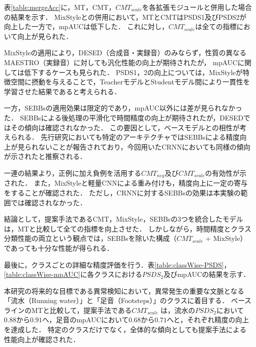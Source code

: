 \documentclass[main]{subfiles}
\begin{document}
表\ref{table:mergeAcc}に，MT，CMT，$CMT_{scale}$を各拡張モジュールと併用した場合の結果を示す． 
MixStyleとの併用において，MTとCMTはPSDS1及びPSDS2が向上した一方で，mpAUCは低下した．
これに対し，$CMT_{scale}$は全ての指標において向上が見られた．\par 

MixStyleの適用により，DESED（合成音・実録音）のみならず，性質の異なるMAESTRO（実録音）に対しても汎化性能の向上が期待されたが，
mpAUCに関しては低下するケースも見られた． 
PSDS1，2の向上については，MixStyleが特徴空間に摂動を与えることで，TeacherモデルとStudentモデル間により一貫性を学習させた結果であると考えられる．\par

一方，SEBBsの適用効果は限定的であり，mpAUC以外には差が見られなかった．
SEBBsによる後処理の平滑化で時間精度の向上が期待されたが，DESEDではその傾向は確認されなかった．
この要因として，ベースモデルとの相性が考えられる．
先行研究においても特定のアーキテクチャではSEBBsによる精度向上が見られないことが報告されており，今回用いたCRNNにおいても同様の傾向が示されたと推察される．\par

一連の結果より，正例に加え負例を活用する$CMT_{neg}$及び$CMT_{scale}$の有効性が示された．
また，MixStyleと軽量CNNによる重み付けも，精度向上に一定の寄与をすることが確認された．
ただし，CRNNに対するSEBBsの効果は本実験の範囲では確認されなかった．\par 

結論として，提案手法であるCMT，MixStyle，SEBBsの3つを統合したモデルは，MTと比較して全ての指標を向上させた．
しかしながら，時間精度とクラス分類性能の両立という観点では，SEBBsを除いた構成（$CMT_{scale}$  + MixStyle）であっても十分な性能が得られる．\par


最後に，クラスごとの詳細な精度評価を行う．表\ref{table:classWise-PSDS}，\ref{table:classWise-mpAUC}に各クラスにおける$PSDS_2$及びmpAUCの結果を示す．\par
本研究の将来的な目標である異常検知において，異常発生の重要な文脈となる「流水（Running water）」と「足音（Footsteps）」のクラスに着目する．
ベースラインのMTと比較して，提案手法である$CMT_{scale}$ は，流水の$PSDS_2$において$0.88$から$0.91$へ，足音のmpAUCにおいて$0.68$から$0.71$へと，それぞれ精度の向上を達成した．
特定のクラスだけでなく，全体的な傾向としても提案手法による性能向上が確認された．
\end{document}
